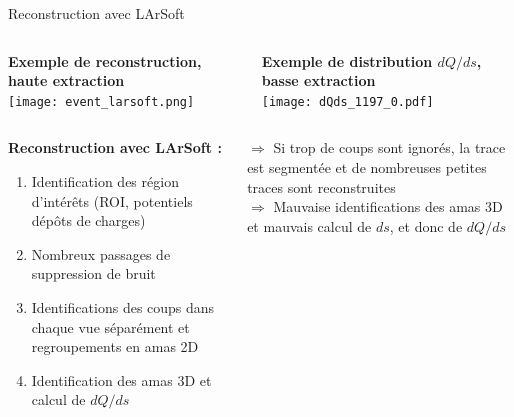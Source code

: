    \begin{frame}{Reconstruction avec LArSoft}
        \begin{scriptsize}
            \begin{columns}
                \begin{column}{0.65\textwidth}
                    \centering \textbf{Exemple de reconstruction, haute extraction}\\
                    \centering \texttt{[image: event\_larsoft.png]}
                \end{column}
                \begin{column}{0.35\textwidth}
                    \centering \textbf{Exemple de distribution $dQ/ds$, basse extraction}\\
                    \centering \texttt{[image: dQds\_1197\_0.pdf]}
                \end{column}
            \end{columns}\vfill
            \begin{columns}
                \begin{column}{0.5\textwidth}
                    \textbf{Reconstruction avec LArSoft :}
                    \begin{enumerate}
                        \item Identification des région d'intérêts (ROI, potentiels dépôts de charges)
                        \item Nombreux passages de suppression de bruit
                        \item Identifications des coups dans chaque vue séparément et regroupements en amas 2D
                        \item Identification des amas 3D et calcul de $dQ/ds$
                    \end{enumerate}
                \end{column}
                \begin{column}{0.5\textwidth}
                    $\Rightarrow$ Si trop de coups sont ignorés, la trace est segmentée et de nombreuses petites traces sont reconstruites\\
                    $\Rightarrow$ Mauvaise identifications des amas 3D et mauvais calcul de $ds$, et donc de $dQ/ds$
                \end{column}
            \end{columns}
        \end{scriptsize}
    \end{frame}
    
